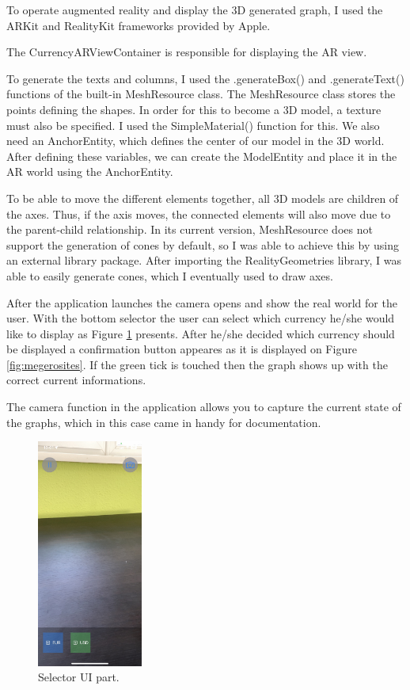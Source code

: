 \documentclass[a4paper,oneside]{article}
\begin{document}
To operate augmented reality and display the 3D generated graph, I used the ARKit and RealityKit frameworks provided by Apple.

The CurrencyARViewContainer is responsible for displaying the AR view.

To generate the texts and columns, I used the .generateBox() and .generateText() functions of the built-in MeshResource class.
The MeshResource class stores the points defining the shapes. In order for this to become a 3D model, a texture must also be specified. I used the SimpleMaterial() function for this.
We also need an AnchorEntity, which defines the center of our model in the 3D world.
After defining these variables, we can create the ModelEntity and place it in the AR world using the AnchorEntity.


To be able to move the different elements together, all 3D models are children of the axes. Thus, if the axis moves, the connected elements will also move due to the parent-child relationship. In its current version, MeshResource does not support the generation of cones by default, so I was able to achieve this by using an external library package. After importing the RealityGeometries library, I was able to easily generate cones, which I eventually used to draw axes.

After the application launches the camera opens and show the real world for the user.  With the bottom selector the user can select which currency he/she  would like to display as Figure \ref{fig:selector} presents.
After he/she decided which currency should be displayed a confirmation button appeares as it is displayed on Figure \ref{fig:megerosites}. If the green tick is touched then the graph shows up with the correct current informations.

The camera function in the application allows you to capture the current state of the graphs, which in this case came in handy for documentation.
\begin{figure}[!ht]
  \centering
  \includegraphics[height=75mm, keepaspectratio]{../images/selector.jpeg}
  \caption{Selector UI part.}
  \label{fig:selector}
\end{figure}
\end{document}
